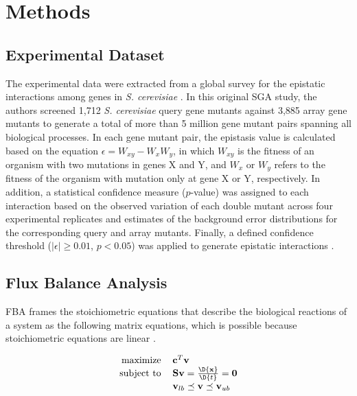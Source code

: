 \section{Methods}
\subsection{Experimental Dataset}
The experimental data were extracted from a global survey for the
epistatic interactions among genes in \textit{S. cerevisiae} \citep{Costanzo2010}. In
this original SGA study, the authors screened 1,712 \textit{S. cerevisiae}
query gene mutants against 3,885 array gene mutants to generate a
total of more than 5 million gene mutant pairs spanning all biological
processes. In each gene mutant pair, the epistasis value is calculated
based on the equation $\epsilon = W_{xy} − W_xW_y$, in which $W_{xy}$
is the fitness of an organism with two mutations in genes X and Y, and
$W_x$ or $W_y$ refers to the fitness of the organism with mutation
only at gene X or Y, respectively. In addition, a statistical
confidence measure ($p$-value) was assigned to each interaction based on
the observed variation of each double mutant across four experimental
replicates and estimates of the background error distributions for the
corresponding query and array mutants. Finally, a defined confidence
threshold ($\left|\epsilon\right| \geq 0.01$, $p < 0.05$) was applied
to generate epistatic interactions \citep{Costanzo2010}.

\subsection{Flux Balance Analysis}

FBA frames the stoichiometric equations that describe the biological
reactions of a system as the following matrix equations, which is
possible because stoichiometric equations are linear \citep{Mo2009,
Becker2007, Smallbone2009a}.

\begin{equation}
\centering
\begin{tabular}{rl}
maximize   & $\mathbf{c}^T\mathbf{v}$                                     \\
subject to & $\mathbf{S v} = \frac{\D{\mathbf{x}}}{\D{t}} = \mathbf{0}$   \\
           & $\mathbf{v}_{lb} \preceq \mathbf{v} \preceq \mathbf{v}_{ub}$ \\
\end{tabular}
\end{equation}

